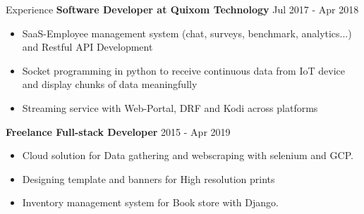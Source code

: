 \documentclass{resume} %
\begin{document}
\begin{rSection}{Experience}
{\textbf{Software Developer at Quixom Technology}}   \hfill {Jul 2017 - Apr 2018}
\begin{itemize}
    \item SaaS-Employee management system (chat, surveys, benchmark, analytics...) and Restful API Development
    \item Socket programming in python to receive continuous data from IoT device and display chunks of data meaningfully
    \item Streaming service with Web-Portal, DRF and Kodi across platforms
\end{itemize}

{\textbf{Freelance Full-stack Developer}}   \hfill {2015 - Apr 2019}
\begin{itemize}
    \item Cloud solution for Data gathering and webscraping with selenium and GCP.
    \item Designing template and banners for High resolution prints
    \item Inventory management system for Book store with Django.
\end{itemize}

\end{rSection}
\end{document}

